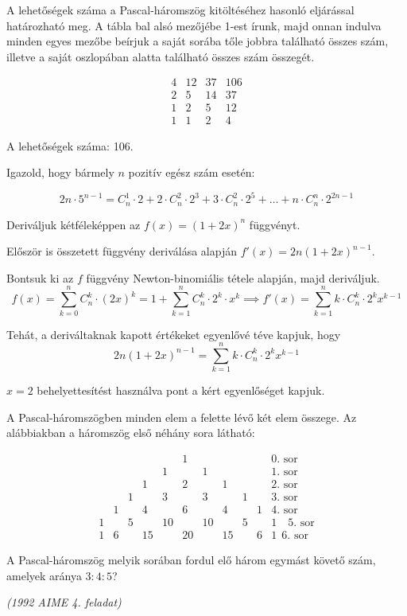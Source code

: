 \begin{solution}
A lehetőségek száma a Pascal-háromszög kitöltéséhez hasonló eljárással
határozható meg. A tábla bal alsó mezőjébe 1-est írunk, majd onnan
indulva minden egyes mezőbe beírjuk a saját sorába tőle jobbra található
összes szám, illetve a saját oszlopában alatta található összes szám
összegét.

\[
\begin{array}{cccc}
4 & 12 & 37 & 106\\
2 & 5 & 14 & 37\\
1 & 2 & 5 & 12\\
1 & 1 & 2 & 4
\end{array}
\]

A lehetőségek száma: 106. 
\end{solution}
\begin{extraproblem}
Igazold, hogy bármely $n$ pozitív egész szám esetén:

\[
2n\cdot5^{n-1}=C_{n}^{1}\cdot2+2\cdot C_{n}^{2}\cdot2^{3}+3\cdot C_{n}^{2}\cdot2^{5}+\dots+n\cdot C_{n}^{n}\cdot2^{2n-1}
\]
\end{extraproblem}

\begin{solution}
Deriváljuk kétféleképpen az $f(x)=(1+2x)^{n}$ függvényt.

Először is összetett függvény deriválása alapján $f'(x)=2n(1+2x)^{n-1}$.

Bontsuk ki az $f$ függvény Newton-binomiális tétele alapján, majd
deriváljuk. 
\[
f(x)=\sum_{k=0}^{n}C_{n}^{k}\cdot(2x)^{k}=1+\sum_{k=1}^{n}C_{n}^{k}\cdot2^{k}\cdot x^{k}\implies f'(x)=\sum_{k=1}^{n}k\cdot C_{n}^{k}\cdot2^{k}x^{k-1}
\]

Tehát, a deriváltaknak kapott értékeket egyenlővé téve kapjuk, hogy
\[
2n(1+2x)^{n-1}=\sum_{k=1}^{n}k\cdot C_{n}^{k}\cdot2^{k}x^{k-1}
\]

$x=2$ behelyettesítést használva pont a kért egyenlőséget kapjuk. 
\end{solution}
\begin{extraproblem}
A Pascal-háromszögben minden elem a felette lévő két elem összege.
Az alábbiakban a háromszög első néhány sora látható:

\[
\begin{array}{ccccccccccc}
 &  &  &  &  & 1 &  &  &  &  & \text{0. sor}\\
 &  &  &  & 1 &  & 1 &  &  &  & \text{1. sor}\\
 &  &  & 1 &  & 2 &  & 1 &  &  & \text{2. sor}\\
 &  & 1 &  & 3 &  & 3 &  & 1 &  & \text{3. sor}\\
 & 1 &  & 4 &  & 6 &  & 4 &  & 1 & \text{4. sor}\\
1 &  & 5 &  & 10 &  & 10 &  & 5 &  & 1\quad\text{5. sor}\\
1 & 6 &  & 15 &  & 20 &  & 15 &  & 6 & 1\ \ \text{6. sor}
\end{array}
\]

A Pascal-háromszög melyik sorában fordul elő három egymást követő
szám, amelyek aránya $3:4:5$?

\emph{(1992 AIME 4. feladat)}
\end{extraproblem}

